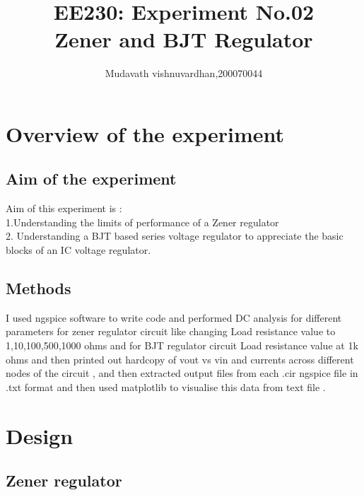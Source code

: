 \documentclass[12pt]{article}
\title{EE230: Experiment No.02\\
Zener and BJT Regulator\\}
\author{Mudavath vishnuvardhan,200070044}
\begin{document}
\maketitle

\section{Overview of the experiment} %

\subsection{Aim of the experiment}%

Aim of this experiment is :\\
1.Understanding the limits of performance of a Zener regulator\\
2. Understanding a BJT based series voltage regulator to appreciate the basic blocks of an IC
voltage regulator.

\subsection{ Methods}

I used ngspice software to write code and performed DC analysis for different parameters for zener regulator circuit like changing Load resistance value to 1,10,100,500,1000 ohms and for BJT regulator circuit Load resistance value at 1k ohms and then printed out hardcopy of vout vs vin and currents across different nodes of the circuit , and then extracted output files from each .cir ngspice file in .txt format and then used matplotlib to visualise this data from text file .
\newpage
\section{Design}%

\subsection{Zener regulator}
\end{document}

